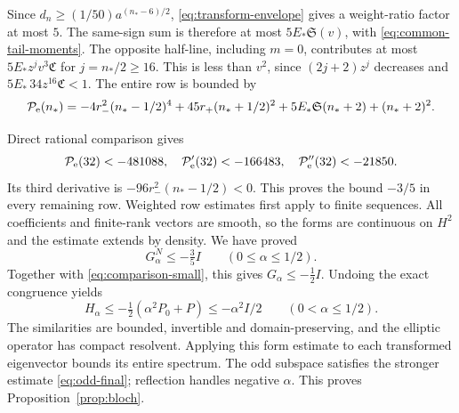 \documentclass[a4paper,11pt]{article}
\numberwithin{equation}{section}
\theoremstyle{definition}
\theoremstyle{remark}
\begin{document}
Since $d_n\ge(1/50)a^{(n_*-6)/2}$, \eqref{eq:transform-envelope} gives a weight-ratio factor at most $5$. The same-sign sum is therefore at most $5E_*\mathfrak S(v)$, with \eqref{eq:common-tail-moments}. The opposite half-line, including $m=0$, contributes at most $5E_*z^jv^3\mathfrak C$ for $j=n_*/2\ge16$. This is less than $v^2$, since $(2j+2)z^j$ decreases and $5E_*\,34z^{16}\mathfrak C<1$. The entire row is bounded by
\begin{equation}\label{eq:even-high}
 \mathcal P_{\rm e}(n_*)=-4r_-^2(n_*-1/2)^4+45r_+(n_*+1/2)^2
 +5E_*\mathfrak S(n_*+2)+(n_*+2)^2.
\end{equation}

Direct rational comparison gives
\[
 \mathcal P_{\rm e}(32)<-481088,\quad
 \mathcal P_{\rm e}'(32)<-166483,\quad
 \mathcal P_{\rm e}''(32)<-21850.
\]
Its third derivative is $-96r_-^2(n_*-1/2)<0$. This proves the bound $-3/5$ in every remaining row. Weighted row estimates first apply to finite sequences. All coefficients and finite-rank vectors are smooth, so the forms are continuous on $H^2$ and the estimate extends by density. We have proved
\[
 G_\alpha^N\le-\tfrac35I\qquad(0\le\alpha\le1/2).
\]
Together with \eqref{eq:comparison-small}, this gives $G_\alpha\le-\tfrac12I$. Undoing the exact congruence yields
\[
 H_\alpha\le-\tfrac12(\alpha^2P_0+P)\le-\alpha^2I/2\qquad(0<\alpha\le1/2).
\]
The similarities are bounded, invertible and domain-preserving, and the elliptic operator has compact resolvent. Applying this form estimate to each transformed eigenvector bounds its entire spectrum. The odd subspace satisfies the stronger estimate \eqref{eq:odd-final}; reflection handles negative $\alpha$. This proves Proposition~\ref{prop:bloch}.
\end{document}
